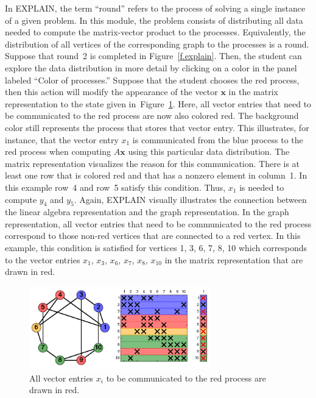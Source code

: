 \documentclass[12pt, oneside]{book}
\newcommand{\mat}[1]{\ensuremath{#1}}
\newcommand{\vek}[1]{{\ensuremath{\mathbf #1}}}
\newcommand{\figref}[1]{Figure~\protect\ref{#1}}
\begin{document}
In EXPLAIN, the term ``round'' refers to the process of solving a single instance of a
given problem. In this module, the problem consists of distributing all data needed to
compute the matrix-vector product to the processes. Equivalently, the distribution of all
vertices of the corresponding graph to the processes is a round. Suppose that round~2 is
completed in \figref{f.explain}. Then, the student can explore the data distribution in
more detail by clicking on a color in the panel labeled ``Color of processes.'' Suppose
that the student chooses the red process, then this action will modify the appearance of
the vector \vek{x} in the matrix representation to the state given
in~\figref{f.communication}. Here, all vector entries that need to be communicated to the
red process are now also colored red. The background color still represents the process
that stores that vector entry. This illustrates, for instance, that the vector entry
$x_1$ is communicated from the blue process to the red process when computing $\mat{A}
\vek{x}$ using this particular data distribution. The matrix representation visualizes
the reason for this communication. There is at least one row that is colored red and that
has a nonzero element in column~1. In this example row~4 and row~5 satisfy this
condition. Thus, $x_1$ is needed to compute $y_4$ and $y_5$. Again, EXPLAIN visually
illustrates the connection between the linear algebra representation and the graph
representation. In the graph representation, all vector entries that need to be
communicated to the red process correspond to those non-red vertices that are connected
to a red vertex. In this example, this condition is satisfied for vertices 1, 3, 6, 7, 8,
10 which corresponds to the vector entries $x_1$, $x_3$, $x_6$, $x_7$, $x_8$, $x_{10}$ in
the matrix representation that are drawn in red.


\begin{figure}
\centering
\includegraphics[width=0.7\textwidth]{redComm}
\caption{All vector entries $x_i$ to be communicated to the red process are drawn in red.}
\label{f.communication}
\end{figure}
\end{document}
